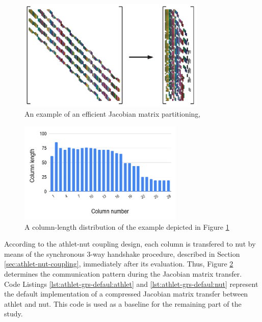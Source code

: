 \figpointer{\ref{fig:matrix-partitioning-example}}
\begin{figure}[htpb]
  \centering
  \includegraphics[width=0.8\textwidth]{figures/matrix-compression.png}
  \caption{An example of an efficient Jacobian matrix partitioning, \cite{gebremedhin2005color}} \label{fig:matrix-partitioning-example}
\end{figure}


\begin{figure}[htpb]
  \centering
  \includegraphics[width=0.7\textwidth]{figures/matrix-compression-2.png}
  \caption{A column-length distribution of the example depicted in Figure \ref{fig:matrix-partitioning-example}} \label{fig:matrix-column-distribution}
\end{figure}


According to the \acrshort{athlet}-\acrshort{nut} coupling design, each column is transfered to \acrshort{nut} by means of the synchronous 3-way handshake procedure, described in Section \ref{sec:athlet-nut-coupling}, immediately after its evaluation. Thus,  Figure \ref{fig:matrix-column-distribution} determines the communication pattern during the Jacobian matrix transfer.\\


Code Listings \ref{lst:athlet-grs-defaul:athlet} and \ref{lst:athlet-grs-defaul:nut} represent the default implementation of a compressed Jacobian matrix transfer between \acrshort{athlet} and \acrshort{nut}. This code is used as a baseline for the remaining part of the study.\\


